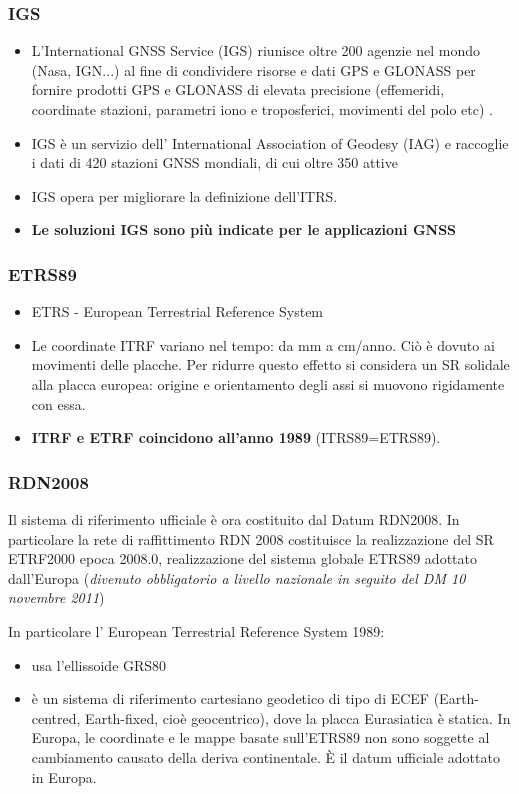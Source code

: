 \documentclass{beamer}
\begin{document}
{\begin{frame}
\end{frame}

\begin{frame}
	\frametitle{IGS}
		\begin{itemize}
		\item L'International GNSS Service (IGS) riunisce oltre 200 agenzie nel mondo (Nasa, IGN...) al fine di condividere risorse e dati GPS e GLONASS per fornire prodotti GPS e GLONASS di elevata precisione (effemeridi, coordinate stazioni, parametri iono e troposferici, movimenti del polo etc) .
		\item IGS è un servizio dell' International Association of Geodesy (IAG) e raccoglie i dati di 420 stazioni GNSS mondiali, di cui oltre 350 attive
		\item IGS opera per migliorare la definizione dell'ITRS.
		\item \textbf{Le soluzioni IGS sono più indicate per le applicazioni GNSS}
	\end{itemize}	
\end{frame}

\begin{frame}
	\frametitle{ETRS89}
	\begin{itemize}
		\item ETRS - European Terrestrial Reference System
		\item Le coordinate ITRF variano nel tempo: da mm a cm/anno. Ciò è dovuto ai movimenti delle 	placche. Per ridurre questo effetto si considera un SR solidale alla placca europea: origine e orientamento
		degli assi si muovono rigidamente con essa.
		\item \textbf{ITRF e ETRF coincidono all'anno 1989} (ITRS89=ETRS89).
	\end{itemize}	
\end{frame}



\begin{frame}
	\frametitle{RDN2008}
	Il sistema di riferimento ufficiale è ora costituito dal Datum RDN2008. In particolare la rete di raffittimento RDN 2008 costituisce la realizzazione del SR ETRF2000 epoca 2008.0, realizzazione del sistema globale ETRS89 adottato dall'Europa (\textit{divenuto obbligatorio a livello nazionale in seguito del DM 10 novembre 2011})

	In particolare l' European Terrestrial Reference System 1989:	
	
	\begin{itemize} 
		\item usa l'ellissoide GRS80
		\item è un sistema di riferimento cartesiano geodetico di tipo di ECEF (Earth-centred, Earth-fixed, cioè geocentrico), dove la placca Eurasiatica è statica. In Europa, le coordinate e le mappe basate sull'ETRS89 non sono soggette al cambiamento causato della deriva continentale. È il datum ufficiale adottato in Europa.
	\end{itemize}
	

\end{frame}}
\end{document}
